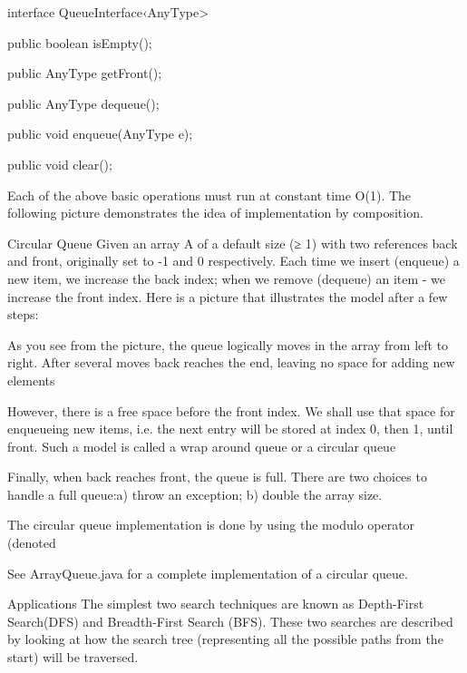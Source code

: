 interface QueueInterface‹AnyType>
{
   public boolean isEmpty();

   public AnyType getFront();

   public AnyType dequeue();

   public void enqueue(AnyType e);

   public void clear();
}
Each of the above basic operations must run at constant time O(1). The following picture demonstrates the idea of implementation by composition.



Circular Queue
Given an array A of a default size (≥ 1) with two references back and front, originally set to -1 and 0 respectively. Each time we insert (enqueue) a new item, we increase the back index; when we remove (dequeue) an item - we increase the front index. Here is a picture that illustrates the model after a few steps:



As you see from the picture, the queue logically moves in the array from left to right. After several moves back reaches the end, leaving no space for adding new elements



However, there is a free space before the front index. We shall use that space for enqueueing new items, i.e. the next entry will be stored at index 0, then 1, until front. Such a model is called a wrap around queue or a circular queue



Finally, when back reaches front, the queue is full. There are two choices to handle a full queue:a) throw an exception; b) double the array size.

The circular queue implementation is done by using the modulo operator (denoted %

See ArrayQueue.java for a complete implementation of a circular queue.

Applications
The simplest two search techniques are known as Depth-First Search(DFS) and Breadth-First Search (BFS). These two searches are described by looking at how the search tree (representing all the possible paths from the start) will be traversed.


